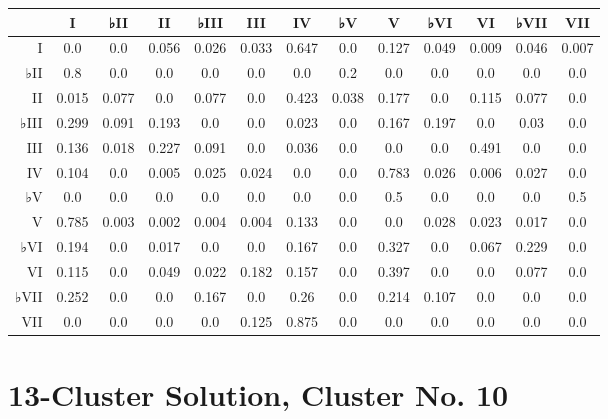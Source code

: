 \begin{table}[htbp]
\begin{minipage}{\linewidth}
\setlength{\tymax}{0.5\linewidth}
\centering
\small
\begin{tabulary}{\textwidth}{@{}RCCCCCCCCCCCC@{}} \toprule
&I&♭II&II&♭III&III&IV&♭V&V&♭VI&VI&♭VII&VII\\
\midrule
I&0.0&0.0&0.056&0.026&0.033&0.647&0.0&0.127&0.049&0.009&0.046&0.007\\
♭II&0.8&0.0&0.0&0.0&0.0&0.0&0.2&0.0&0.0&0.0&0.0&0.0\\
II&0.015&0.077&0.0&0.077&0.0&0.423&0.038&0.177&0.0&0.115&0.077&0.0\\
♭III&0.299&0.091&0.193&0.0&0.0&0.023&0.0&0.167&0.197&0.0&0.03&0.0\\
III&0.136&0.018&0.227&0.091&0.0&0.036&0.0&0.0&0.0&0.491&0.0&0.0\\
IV&0.104&0.0&0.005&0.025&0.024&0.0&0.0&0.783&0.026&0.006&0.027&0.0\\
♭V&0.0&0.0&0.0&0.0&0.0&0.0&0.0&0.5&0.0&0.0&0.0&0.5\\
V&0.785&0.003&0.002&0.004&0.004&0.133&0.0&0.0&0.028&0.023&0.017&0.0\\
♭VI&0.194&0.0&0.017&0.0&0.0&0.167&0.0&0.327&0.0&0.067&0.229&0.0\\
VI&0.115&0.0&0.049&0.022&0.182&0.157&0.0&0.397&0.0&0.0&0.077&0.0\\
♭VII&0.252&0.0&0.0&0.167&0.0&0.26&0.0&0.214&0.107&0.0&0.0&0.0\\
VII&0.0&0.0&0.0&0.0&0.125&0.875&0.0&0.0&0.0&0.0&0.0&0.0\\

\bottomrule

\end{tabulary}
\end{minipage}
\end{table}

\section{13-Cluster Solution, Cluster No. 10}
\label{13-clustersolutionclusterno.10}

